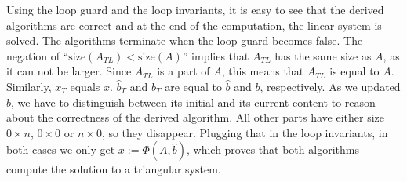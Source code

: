 Using the loop guard and the loop invariants, it is easy to see that the derived algorithms are correct and at the end of the computation, the linear system is solved. The algorithms terminate when the loop guard becomes false. The negation of ``$\text{size}(A_{TL}) < \text{size}(A)$'' implies that $A_{TL}$ has the same size as $A$, as it can not be larger. Since $A_{TL}$ is a part of $A$, this means that $A_{TL}$ is equal to $A$. Similarly, $x_T$ equals $x$. $\hat{b}_T$ and $b_T$ are equal to $\hat{b}$ and $b$, respectively. As we updated $b$, we have to distinguish between its initial and its current content to reason about the correctness of the derived algorithm. All other parts have either size $0 \times n$, $0 \times 0$ or $n \times 0$, so they disappear. Plugging that in the loop invariants, in both cases we only get $x := \Phi \left( A, \hat{b} \right)$, which proves that both algorithms compute the solution to a triangular system.

